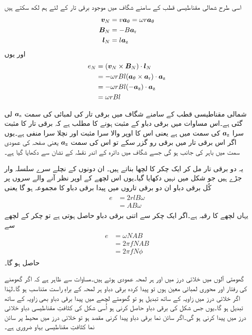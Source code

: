 اسی طرح شمالی مقناطیسی قطب کے سامنے شگاف میں موجود برقی تار کے لئے ہم لکھ سکتے ہیں
\begin{gather}
\begin{aligned}
{\ensuremath{{\boldsymbol{v}}}}_N&=v {\boldsymbol{a}}_{\theta}=\omega r {\boldsymbol{a}}_{\theta}\\
{{\boldsymbol{B}}}_N&=-B {\boldsymbol{a}}_{\textup{r}}\\
{{\boldsymbol{l}}}_N&=l {\boldsymbol{a}}_{\textup{z}}
\end{aligned}
\end{gather}
اور یوں 
\begin{gather}
\begin{aligned}
e_N&=({{\boldsymbol{v}}}_N \times {\ensuremath{{\boldsymbol{B}}}}_N)\cdot {\ensuremath{{\boldsymbol{l}}}}_N\\
&=-\omega r B l ({\boldsymbol{a}}_{\theta} \times {\boldsymbol{a}}_{\textup{r}}) \cdot {\boldsymbol{a}}_{\textup{z}}\\
&=-\omega r B l (-{\boldsymbol{a}}_{\textup{z}}) \cdot {\boldsymbol{a}}_{\textup{z}}\\
&=\omega r B l 
\end{aligned}
\end{gather}

شمالی مقناطیسی قطب کے سامنے شگاف میں برقی تار کی لمبائی کی سمت ${\boldsymbol{a}}_{\textup{z}}$ لی گئی ہے۔اس مساوات میں برقی دباو کے مثبت ہونے کا مطلب ہے کہ برقی تار کا مثبت سرا ${\boldsymbol{a}}_{\textup{z}}$ کی سمت میں ہے یعنی اس کا اوپر والا سرا مثبت اور نچلا  سرا منفی ہے۔یوں اگر اس برقی تار میں برقی رو گزر سکے تو اس کی سمت ${\boldsymbol{a}}_{\textup{z}}$ یعنی صفحہ کی عمودی سمت میں باہر کی جانب ہو گی جسے شگاف میں دائرہ کے اندر نقطہ کے نشان سے دکھایا گیا ہے۔ 

یہ دو برقی تار مل کر ایک چکر کا لچھا بناتے ہیں۔ ان دونوں کے نچلے سرے سلسلہ وار جڑے ہیں جو شکل میں نہیں دکھایا گیا۔یوں اس لچھے کے اوپر نظر آنے والے سروں پر کُل برقی دباو  ان دو برقی تاروں میں پیدا برقی دباو  کا مجموعہ ہو گا یعنی
\begin{gather}
\begin{aligned}
e&=2r l B \omega\\
&=A B \omega
\end{aligned}
\end{gather}
یہاں لچھے کا رقبہ   ہے۔اگر ایک چکر سے اتنی برقی دباو حاصل ہوتی ہے تو  چکر کے لچھے  سے
\begin{gather}
\begin{aligned}\label{مساوات_گھومتے_مشین_پیدا_دباو}
e&=\omega N A B\\
&=2 \pi f N A B\\
&=2 \pi f N \phi
\end{aligned}
\end{gather}
حاصل ہو گا۔

گھومتی آلوں میں خلائی درز میں   اور   ہر لمحہ عمودی ہوتے ہیں۔مساوات   سے ظاہر ہے کہ اگر گھومنے کی رفتار اور محوری لمبائی معین ہوں تو پیدا کردہ برقی دباو  ہر لمحہ   کے براہِ راست متناسب ہو گا۔لہٰذا اگر خلائی درز میں زاویہ کے ساتھ   تبدیل ہو تو گھومتے لچھے میں پیدا برقی دباو بھی زاویہ کے ساتھ تبدیل ہو گا۔یوں جس شکل کی برقی دباو حاصل کرنی ہو اُسی شکل کی کثافتِ مقناطیسی دباو خلائی درز میں پیدا کرنی ہو گی۔اگر سائن نما برقی دباو پیدا کرنی مقصد ہو تو خلائی درز میں محیط پر سائن نما کثافتِ مقناطیسی بہاو ضروری ہے۔

